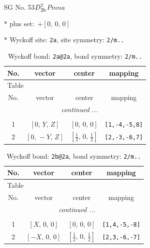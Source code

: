 \documentclass[fleqn,8pt]{jsarticle}
\begin{document}
\setcounter{MaxMatrixCols}{32}

\renewcommand{\tablename}{Table~}
\renewcommand{\figurename}{Figure~}
\begin{center}
\LARGE
SG No. 53\quad$D_{\rm 2h}^{7}$\quad$Pmna$\quad[ orthorhombic ]
\end{center}

* plus set:\,\,\,$+\left[ 0,\, 0,\, 0 \right]$


* Wyckoff site: {\tt 2a}, site symmetry: {\tt 2/m..}
\renewcommand{\arraystretch}{1.2}
\begin{longtable}{cccc}
\caption{Wyckoff bond: {\tt 2a@2a}, bond symmetry: {\tt 2/m..}}
 \\
 \hline \hline
No. & vector & center & mapping \\ \hline \endfirsthead

\multicolumn{3}{l}{\tablename\ \thetable{}} \\
 \hline \hline
No. & vector & center & mapping \\ \hline \endhead

 \hline \hline
\multicolumn{3}{r}{\footnotesize\it continued ...} \\ \endfoot

 \hline \hline
\multicolumn{3}{r}{} \\ \endlastfoot

1 & $\left[ 0,\, Y,\, Z \right]$ & $\left[ 0,\, 0,\, 0 \right]$ & {\tt [1,-4,-5,8]} \\ \hline
2 & $\left[ 0,\, - Y,\, Z \right]$ & $\left[ \frac{1}{2},\, 0,\, \frac{1}{2} \right]$ & {\tt [2,-3,-6,7]} \\
\end{longtable}
\renewcommand{\arraystretch}{1.2}
\begin{longtable}{cccc}
\caption{Wyckoff bond: {\tt 2b@2a}, bond symmetry: {\tt 2/m..}}
 \\
 \hline \hline
No. & vector & center & mapping \\ \hline \endfirsthead

\multicolumn{3}{l}{\tablename\ \thetable{}} \\
 \hline \hline
No. & vector & center & mapping \\ \hline \endhead

 \hline \hline
\multicolumn{3}{r}{\footnotesize\it continued ...} \\ \endfoot

 \hline \hline
\multicolumn{3}{r}{} \\ \endlastfoot

1 & $\left[ X,\, 0,\, 0 \right]$ & $\left[ 0,\, 0,\, 0 \right]$ & {\tt [1,4,-5,-8]} \\ \hline
2 & $\left[ - X,\, 0,\, 0 \right]$ & $\left[ \frac{1}{2},\, 0,\, \frac{1}{2} \right]$ & {\tt [2,3,-6,-7]} \\
\end{longtable}
\end{document}
